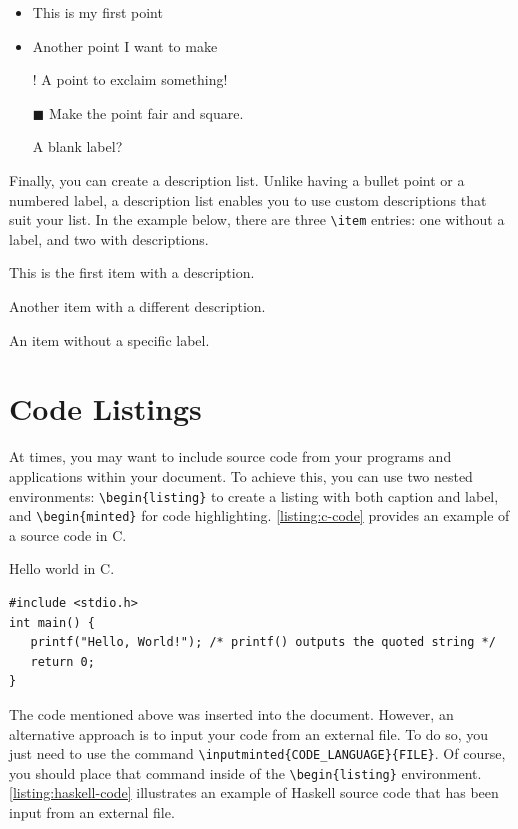 {\begin{itemize}
  \item This is my first point
  \item Another point I want to make 
  \item[!] A point to exclaim something!
  \item[$\blacksquare$] Make the point fair and square.
  \item[] A blank label?
\end{itemize}

Finally, you can create a description list. Unlike having a bullet point or a numbered label, a description list enables you to use custom descriptions that suit your list. In the example below, there are three \verb|\item| entries: one without a label, and two with descriptions.

\begin{description}
    \item[Item 1:] This is the first item with a description.
    \item[Item 2:] Another item with a different description.
    \item An item without a specific label.
\end{description}

\section{Code Listings}
At times, you may want to include source code from your programs and applications within your document. To achieve this, you can use two nested environments: \verb|\begin{listing}| to create a listing with both caption and label, and \verb|\begin{minted}| for code highlighting. \autoref{listing:c-code} provides an example of a source code in C.

\begin{listing}[!htpb]
\caption{Hello world in C.}
\label{listing:c-code}
\begin{verbatim}
#include <stdio.h>
int main() {
   printf("Hello, World!"); /* printf() outputs the quoted string */
   return 0;
}
\end{verbatim}
\end{listing}

The code mentioned above was inserted into the document. However, an alternative approach is to input your code from an external file. To do so, you just need to use the command \verb|\inputminted{CODE_LANGUAGE}{FILE}|. Of course, you should place that command inside of the \verb|\begin{listing}| environment. \autoref{listing:haskell-code} illustrates an example of Haskell source code that has been input from an external file.

}
